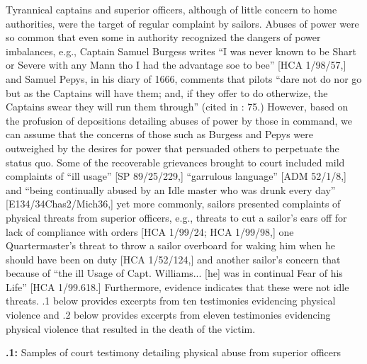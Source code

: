 Tyrannical captains and superior officers, although of little concern to home authorities, were the target of regular complaint by sailors. Abuses of power were so common that even some in authority recognized the dangers of power imbalances, e.g., Captain Samuel Burgess writes “I was never known to be Shart or Severe with any Mann tho I had the advantage soe to bee” [HCA 1/98/57,] and Samuel Pepys, in his diary of 1666, comments that pilots “dare not do nor go but as the Captains will have them; and, if they offer to do otherwize, the Captains swear they will run them through” (cited in \citealt{Lavery2009}: 75.) However, based on the profusion of depositions detailing abuses of power by those in command, we can assume that the concerns of those such as Burgess and Pepys were outweighed by the desires for power that persuaded others to perpetuate the status quo. Some of the recoverable grievances brought to court included mild complaints of “ill usage” [SP 89/25/229,] “garrulous language” [ADM 52/1/8,] and “being continually abused by an Idle master who was drunk every day” [E134/34Chas2/Mich36,] yet more commonly, sailors presented complaints of physical threats from superior officers, e.g., threats to cut a sailor’s ears off for lack of compliance with orders [HCA 1/99/24; HCA 1/99/98,] one Quartermaster’s threat to throw a sailor overboard for waking him when he should have been on duty [HCA 1/52/124,] and another sailor’s concern that because of “the ill Usage of Capt. Williams... [he] was in continual Fear of his Life” [HCA 1/99.618.] Furthermore, evidence indicates that these were not idle threats. .1 below provides excerpts from ten testimonies evidencing physical violence and .2 below provides excerpts from eleven testimonies evidencing physical violence that resulted in the death of the victim.

\textbf{.1:} Samples of court testimony detailing physical abuse from superior officers

